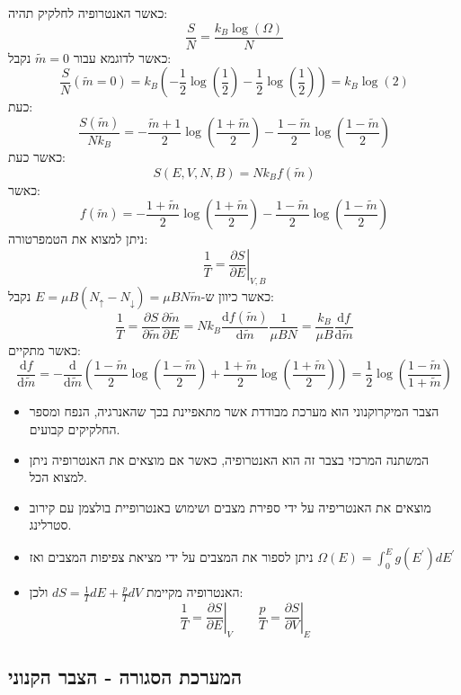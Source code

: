 \documentclass{tstextbook}
\begin{document}
\begin{example}
כאשר האנטרופיה לחלקיק תהיה:
$$\frac{S}{N}=\frac{k_{B}\log\left( \Omega \right)}{N}$$
כאשר לדוגמא עבור \(\tilde{m}=0\) נקבל:
$$\frac{S}{N}\left( \tilde{m} = 0 \right)=k_{B}\left( -\frac{1}{2}\log\left( \frac{1}{2} \right)-\frac{1}{2}\log\left( \frac{1}{2} \right) \right)=k_{B}\log(2)$$
כעת:
$$\frac{S\left( \tilde{m} \right)}{Nk_{B}}=-\frac{\tilde{m}+1}{2}\log\left( \frac{1+\tilde{m}}{2} \right)- \frac{1-\tilde{m}}{2}\log\left( \frac{1-\tilde{m}}{2} \right)$$
כאשר כעת:
$$S(E,V,N,B)=N k_{B} f\left( \tilde{m} \right)$$
כאשר:
$$f\left( \tilde{m} \right)= - \frac{1+\tilde{m}}{2}\log\left( \frac{1+\tilde{m}}{2} \right)-\frac{1-\tilde{m}}{2}\log\left( \frac{1-\tilde{m}}{2} \right)$$
ניתן למצוא את הטמפרטורה:
$$\frac{1}{T}=\left.\frac{\partial S}{\partial E}\right|_{V,B} $$
כאשר כיוון ש-\(E=\mu B\left( N_{\uparrow}-N_{\downarrow} \right)=\mu BN\tilde{m}\) נקבל:
$$\frac{1}{T} = \frac{\partial  S}{\partial \tilde{m}} \frac{\partial \tilde{m}}{\partial E} = Nk_{B}\frac{\mathrm{d} f\left( \tilde{m} \right)}{\mathrm{d} \tilde{m}}  \frac{1}{\mu B N}=\frac{k_{B}}{\mu B}\frac{\mathrm{d} f}{\mathrm{d} \tilde{m}} $$
כאשר מתקיים:
$$\frac{\mathrm{d} f}{\mathrm{d} \tilde{m}} =-\frac{\mathrm{d} }{\mathrm{d} \tilde{m}} \left(\frac{ 1-\tilde{m}}{2}\log\left( \frac{1-\tilde{m}}{2} \right)+\frac{1+\tilde{m}}{2}\log\left( \frac{1+\tilde{m}}{2} \right) \right)=\frac{1}{2}\log\left( \frac{1-\tilde{m} }{1+\tilde{m}}\right)$$

\end{example}
\begin{summary}
  \begin{itemize}
    \item הצבר המיקרוקנוני הוא מערכת מבודדת אשר מתאפיינת בכך שהאנרגיה, הנפח ומספר החלקיקים קבועים.
    \item המשתנה המרכזי בצבר זה הוא האנטרופיה, כאשר אם מוצאים את האנטרופיה ניתן למצוא הכל.
    \item מוצאים את האנטריפיה על ידי ספירת מצבים ושימוש באנטרופיית בולצמן עם קירוב סטרלינג.
    \item ניתן לספור את המצבים על ידי מציאת צפיפות המצבים ואז \({\Omega}(E)=\int_{0}^{E}g(E^{\prime})d E^{\prime}\)
    \item האנטרופיה מקיימת \(dS= \frac{1}{T}dE+\frac{p}{T}dV\) ולכן:
$$\frac{1}{T}=\left. \frac{\partial S}{\partial E} \right \rvert_{V} \qquad \frac{p}{T}=\left. \frac{\partial S}{\partial V} \right \rvert_{E}$$
  \end{itemize}
\end{summary}
\subsection{המערכת הסגורה - הצבר הקנוני}
\end{document}

